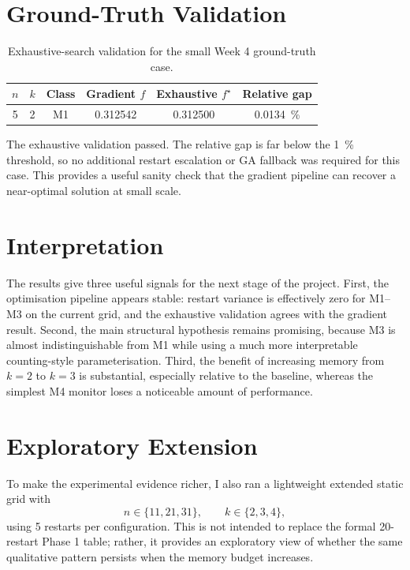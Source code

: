 \documentclass[11pt,a4paper]{article}
\begin{document}
\section{Ground-Truth Validation}

\begin{table}[htbp]
  \centering
  \caption{Exhaustive-search validation for the small Week 4 ground-truth case.}
  \label{tab:ground-truth}
  \begin{tabular}{cccccc}
    \toprule
    $n$ & $k$ & Class & Gradient $f$ & Exhaustive $f^\star$ & Relative gap \\
    \midrule
    5 & 2 & M1 & 0.312542 & 0.312500 & \SI{0.0134}{\percent} \\
    \bottomrule
  \end{tabular}
\end{table}

The exhaustive validation passed. The relative gap is far below the
\SI{1}{\percent} threshold, so no additional restart escalation or GA fallback
was required for this case. This provides a useful sanity check that the
gradient pipeline can recover a near-optimal solution at small scale.

\section{Interpretation}

The results give three useful signals for the next stage of the project. First,
the optimisation pipeline appears stable: restart variance is effectively zero
for M1--M3 on the current grid, and the exhaustive validation agrees with the
gradient result. Second, the main structural hypothesis remains promising,
because M3 is almost indistinguishable from M1 while using a much more
interpretable counting-style parameterisation. Third, the benefit of increasing
memory from $k=2$ to $k=3$ is substantial, especially relative to the baseline,
whereas the simplest M4 monitor loses a noticeable amount of performance.

\section{Exploratory Extension}

To make the experimental evidence richer, I also ran a lightweight extended
static grid with
\[
  n \in \{11,21,31\}, \qquad k \in \{2,3,4\},
\]
using 5 restarts per configuration. This is not intended to replace the formal
20-restart Phase 1 table; rather, it provides an exploratory view of whether
the same qualitative pattern persists when the memory budget increases.
\end{document}
